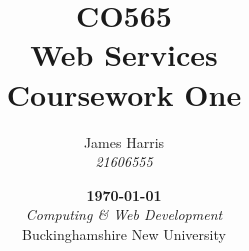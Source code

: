 \title{
  \Large CO565\\
  Web Services\vspace*{.65cm}\\
  \huge Coursework One\vfill
}
\author{
  James Harris\\
  \textit{21606555}
}
\date{
  \vfill\textbf\today\\
  \vspace*{.75cm}\textit{Computing \& Web Development}\\
  Buckinghamshire New University
}
\maketitle
{}
